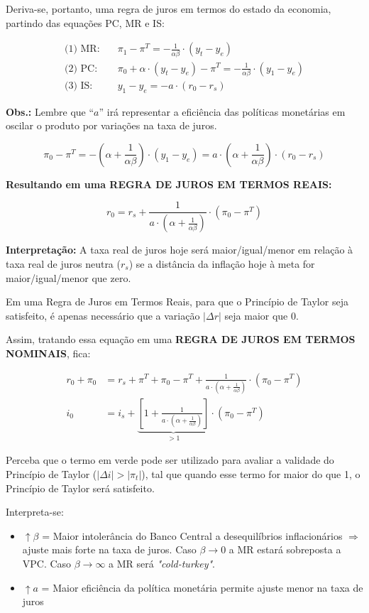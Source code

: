 \documentclass[a4paper,12pt]{article}[abntex2]
\begin{document}
Deriva-se, portanto, uma regra de juros em termos do estado da economia, partindo das equações PC, MR e IS:

\begin{align}
\text{(1) MR:} \quad & \pi_1 - \pi^T = -\frac{1}{\alpha \beta} \cdot (y_t - y_e) \\
\text{(2) PC:} \quad & \pi_0 + \alpha \cdot (y_t - y_e) - \pi^T = -\frac{1}{\alpha \beta} \cdot (y_1 - y_e) \\
\text{(3) IS:} \quad & y_1 - y_e = -a \cdot (r_0 - r_s)
\end{align}

\textbf{Obs.:} Lembre que “$a$” irá representar a eficiência das políticas monetárias em oscilar o produto por variações na taxa de juros.

\[
\pi_0 - \pi^T = -\left( \alpha + \frac{1}{\alpha \beta} \right) \cdot (y_1 - y_e)
= a \cdot \left( \alpha + \frac{1}{\alpha \beta} \right) \cdot (r_0 - r_s)
\]

\textbf{Resultando em uma REGRA DE JUROS EM TERMOS REAIS:}

\[
r_0 = r_s + \frac{1}{a \cdot \left( \alpha + \frac{1}{\alpha \beta} \right)} \cdot (\pi_0 - \pi^T)
\]

\textbf{Interpretação:} A taxa real de juros hoje será maior/igual/menor em relação à taxa real de juros neutra (\( r_s \)) se a distância da inflação hoje à meta for maior/igual/menor que zero.

Em uma Regra de Juros em Termos Reais, para que o Princípio de Taylor seja satisfeito, é apenas necessário que a variação \( |\Delta r| \) seja maior que 0.

Assim, tratando essa equação em uma \textbf{REGRA DE JUROS EM TERMOS NOMINAIS}, fica:

\begin{align*}
r_0 + \pi_0 &= r_s + \pi^T + \pi_0 - \pi^T + \frac{1}{a \cdot \left( \alpha + \frac{1}{\alpha \beta} \right)} \cdot (\pi_0 - \pi^T) \\
i_0 &= i_s + \underbrace{\left[ 1+ \frac{1}{a \cdot \left( \alpha + \frac{1}{\alpha \beta} \right)} \right]}_{>1} \cdot (\pi_0 - \pi^T)
\end{align*}

Perceba que o termo em verde pode ser utilizado para avaliar a validade do Princípio de Taylor (\( |\Delta i| > |\pi_t| \)), tal que quando esse termo for maior do que 1, o Princípio de Taylor será satisfeito.

Interpreta-se:

\begin{itemize}
  \item \( \uparrow \beta \) = Maior intolerância do Banco Central a desequilíbrios inflacionários \( \Rightarrow \) ajuste mais forte na taxa de juros. Caso \(\beta \rightarrow 0\) a MR estará sobreposta a VPC. Caso \(\beta \rightarrow\infty\) a MR será \textit{"cold-turkey"}.
  \item \( \uparrow a \) = Maior eficiência da política monetária permite ajuste menor na taxa de juros
\end{itemize}
\end{document}
